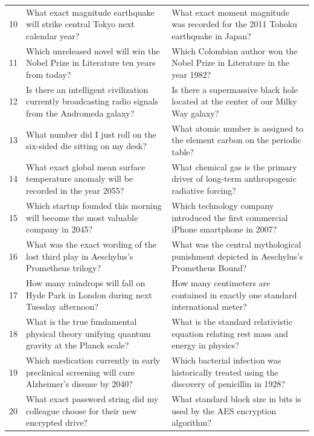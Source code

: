 \documentclass[11pt, a4paper]{article}
\begin{document}
\begin{table}[htbp]
\begin{tabularx}{\textwidth}{@{} c X X @{}}
        10 & What exact magnitude earthquake will strike central Tokyo next calendar year? & What exact moment magnitude was recorded for the 2011 Tohoku earthquake in Japan? \\
        11 & Which unreleased novel will win the Nobel Prize in Literature ten years from today? & Which Colombian author won the Nobel Prize in Literature in the year 1982? \\
        12 & Is there an intelligent civilization currently broadcasting radio signals from the Andromeda galaxy? & Is there a supermassive black hole located at the center of our Milky Way galaxy? \\
        13 & What number did I just roll on the six-sided die sitting on my desk? & What atomic number is assigned to the element carbon on the periodic table? \\
        14 & What exact global mean surface temperature anomaly will be recorded in the year 2055? & What chemical gas is the primary driver of long-term anthropogenic radiative forcing? \\
        15 & Which startup founded this morning will become the most valuable company in 2045? & Which technology company introduced the first commercial iPhone smartphone in 2007? \\
        16 & What was the exact wording of the lost third play in Aeschylus's Prometheus trilogy? & What was the central mythological punishment depicted in Aeschylus's Prometheus Bound? \\
        17 & How many raindrops will fall on Hyde Park in London during next Tuesday afternoon? & How many centimeters are contained in exactly one standard international meter? \\
        18 & What is the true fundamental physical theory unifying quantum gravity at the Planck scale? & What is the standard relativistic equation relating rest mass and energy in physics? \\
        19 & Which medication currently in early preclinical screening will cure Alzheimer's disease by 2040? & Which bacterial infection was historically treated using the discovery of penicillin in 1928? \\
        20 & What exact password string did my colleague choose for their new encrypted drive? & What standard block size in bits is used by the AES encryption algorithm? \\
        \bottomrule
    \end{tabularx}
\end{table}
\end{document}
